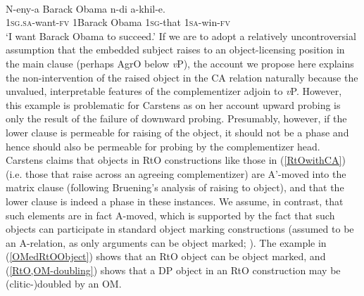 \documentclass[output=paper
,modfonts
,nonflat
]{langsci/langscibook}
\begin{document}
\ea	\label{RtOwithCA}
 \\
\gll N-eny-a Barack Obama n-di a-khil-e.\\
1\textsc{sg}.\textsc{sa}-want-\textsc{fv} 1Barack Obama 1\textsc{sg}-that 1\textsc{sa}-win-\textsc{fv}\\
\glt `I want Barack Obama to succeed.'
\z
\noindent If we are to adopt a relatively uncontroversial assumption that the embedded subject raises to an object-licensing position in the main clause (perhaps AgrO below \textit{v}P), the account we propose here explains the non-intervention of the raised object in the CA relation naturally because the unvalued, interpretable features of the complementizer adjoin to \textit{v}P. However, this example is problematic for Carstens as on her account upward probing is only the result of the failure of downward probing. Presumably, however, if the lower clause is permeable for raising of the object, it should not be a phase and hence should also be permeable for probing by the complementizer head. Carstens claims that objects in RtO constructions like those in (\ref{RtOwithCA}) (i.e. those that raise across an agreeing complementizer) are A’-moved into the matrix clause (following Bruening's \citeyear{Bruening:2001} analysis of raising to object), and that the lower clause is indeed a phase in these instances. We assume, in contrast, that such elements are in fact A-moved, which is supported by the fact that such objects can participate in standard object marking constructions (assumed to be an A-relation, as only arguments can be object marked; \citealt{Diercks:2011,SikukuEt:2017}). The example in (\ref{OMedRtOObject}) shows that an RtO object can be object marked, and (\ref{RtO,OM-doubling}) shows that a DP object in an RtO construction may be (clitic-)doubled by an OM.%

\ea
{} \\
\end{document}
